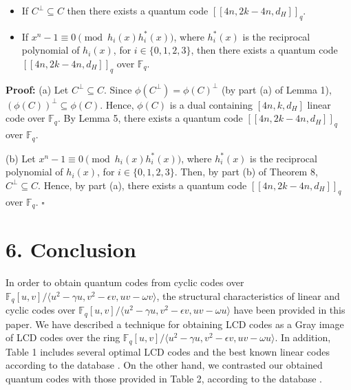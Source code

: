 \documentclass[12pt]{article}
\begin{document}
\begin{itemize}
    \item[(a)] If $C^{\perp} \subseteq C$ then there exists a quantum code $[[4n, 2k - 4n, d_H]]_q$.
    \item[(b)] If $x^n - 1 \equiv 0 \pmod{h_i(x) h_i^*(x)}$, where $h_i^*(x)$ is the reciprocal polynomial of $h_i(x)$, for $i \in \{0,1,2,3\}$, then there exists a quantum code $[[4n, 2k - 4n, d_H]]_q$ over $\mathbb{F}_q$.
\end{itemize}

\noindent
\textbf{Proof:} (a) Let $C^{\perp} \subseteq C$. Since $\phi(C^{\perp}) = \phi(C)^{\perp}$ (by part (a) of Lemma 1), $(\phi(C))^{\perp} \subseteq \phi(C)$. Hence, $\phi(C)$ is a dual containing $[4n, k, d_H]$ linear code over $\mathbb{F}_q$. By Lemma 5, there exists a quantum code $[[4n, 2k - 4n, d_H]]_q$ over $\mathbb{F}_q$.

(b) Let $x^n - 1 \equiv 0 \pmod{h_i(x) h_i^*(x)}$, where $h_i^*(x)$ is the reciprocal polynomial of $h_i(x)$, for $i \in \{0,1,2,3\}$. Then, by part (b) of Theorem 8, $C^{\perp} \subseteq C$. Hence, by part (a), there exists a quantum code $[[4n, 2k - 4n, d_H]]_q$ over $\mathbb{F}_q$. \hfill $\square$

\section*{6. Conclusion}
In order to obtain quantum codes from cyclic codes over $\mathbb{F}_q[u,v]/\langle u^2 - \gamma u, v^2 - \epsilon v, uv - \omega v \rangle$, the structural characteristics of linear and cyclic codes over $\mathbb{F}_q[u,v]/\langle u^2 - \gamma u, v^2 - \epsilon v, uv - \omega u \rangle$ have been provided in this paper. We have described a technique for obtaining LCD codes as a Gray image of LCD codes over the ring $\mathbb{F}_q[u,v]/\langle u^2 - \gamma u, v^2 - \epsilon v, uv - \omega u \rangle$. In addition, Table 1 includes several optimal LCD codes and the best known linear codes according to the database \cite{ref23}. On the other hand, we contrasted our obtained quantum codes with those provided in Table 2, according to the database \cite{ref14}.
\end{document}
